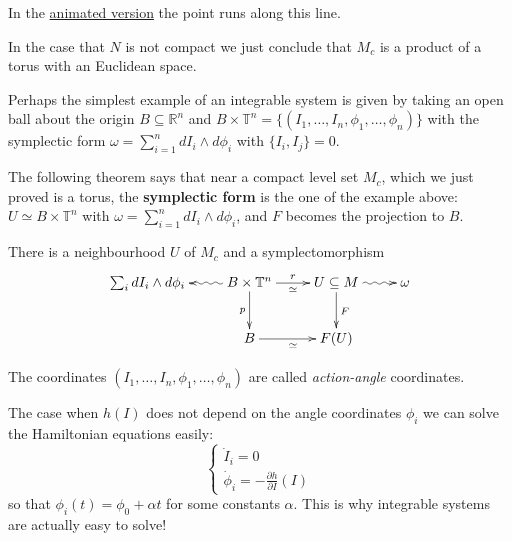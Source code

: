 \noindent
In the
\href{https://www.heap-project.org/models/symplectic-geometry/arnold-liouville-torus.html?step=9}%
{animated version}
the point runs along this line.

\noindent
In the case that $N$ is not compact we just
conclude that
$M_c$ is a product of a torus with an
Euclidean space.

Perhaps the simplest example of an integrable
system
is given by taking an open ball about the
origin $B \subseteq \mathbb{R}^n$
and $B \times
\mathbb{T}^n=\{(I_1,\ldots,I_n,\phi_1,\ldots,
\phi_n)\}$
with the symplectic form $\omega=\sum_{i=1}^n
dI_i \wedge d\phi_i$
with $\{I_i,I_j\}=0$.

The following theorem says that near a
compact level set $M_c$, which we just
proved is a torus, the {\bf symplectic
form} is the one of the example above:
$U \simeq B \times \mathbb{T}^n$ with
$\omega=\sum_{i=1}^n dI_i \wedge d\phi_i$,
and $F$ becomes the projection to $B$.

\begin{theorem}
\label{theorem-local}
There is a neighbourhood $U$ of $M_c$ and
a symplectomorphism
$$
\xymatrix{
\sum_i dI_i \wedge d\phi_i&
B \times
\mathbb{T}^n\ar@{~>}[l]
\ar[r]^{r}_{\simeq}\ar[d]_{p}&U
\subseteq M\ar[d]^{F}
\ar@{~>}[r]
& \omega\\
&B\ar[r]_{\simeq}&F(U)
}
$$
\end{theorem}

\noindent
The coordinates
$(I_1,\ldots,I_n,\phi_1,\ldots,\phi_n)$
are called {\it action-angle} coordinates.

The case when $h(I)$ does not depend on the
angle coordinates $\phi_i$
we can solve the Hamiltonian equations
easily:
$$
\begin{cases}
\dot I_i=0 \\
\dot \phi_i=-\frac{\partial h}{\partial I}(I)
\end{cases}
$$
so that $\phi_i(t)=\phi_0+\alpha t$ for some
constants $\alpha$.
This is why integrable systems are actually
easy to solve!





